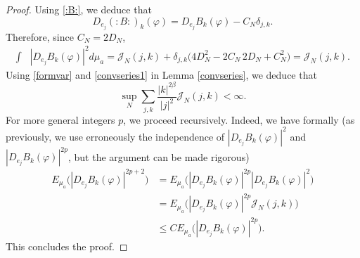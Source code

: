 \documentclass[10pt,a4paper]{amsart}
\begin{document}
\begin{proof}
Using \eqref{:B:}, we deduce that 
$$D_{e_j} (:B :)_k (\varphi) = D_{e_j} B_k (\varphi) - C_N \delta_{j,k} .$$
Therefore, since $C_N=2 D_N$, 
\begin{align*}
\int & |D_{e_j}B_k(\varphi)|^2 d\mu_a =   {\mathcal J}_N(j,k) + \delta_{j,k}\big( 4 D_N^2 - 2C_N \, 2D_N + C_N^2\big)  = {\mathcal J}_N(j,k) . 
\end{align*}
Using \eqref{formvar} and \eqref{convseries1} in Lemma \ref{convseries}, we deduce that
$$\sup_N \sum_{j,k} \frac{|k|^{2\beta}}{|j|^2} {\mathcal J}_N(j,k) <\infty.$$
For more general integers $p$, we proceed recursively. Indeed, we have formally (as previously, we use erroneously the independence
 of $ |D_{e_j}B_k(\varphi)|^2$ and $|D_{e_j}B_k(\varphi)|^{2p}$, but the argument can be made rigorous)  
\begin{align*}
E_{\mu_a}\big(  |D_{e_j}B_k(\varphi)|^{2p+2}\big) 
&=  E_{\mu_a} \big( |D_{e_j}B_k(\varphi)|^{2p} |D_{e_j}B_k(\varphi)|^2 \big)\\
&=  E_{\mu_a} \big( |D_{e_j}B_k(\varphi)|^{2p}  {\mathcal J}_N(j,k)  \big)\\
&\leq C   E_{\mu_a} \big( |D_{e_j}B_k(\varphi) |^{2p} \big).
\end{align*}
This concludes the proof.
\end{proof}
\end{document}
